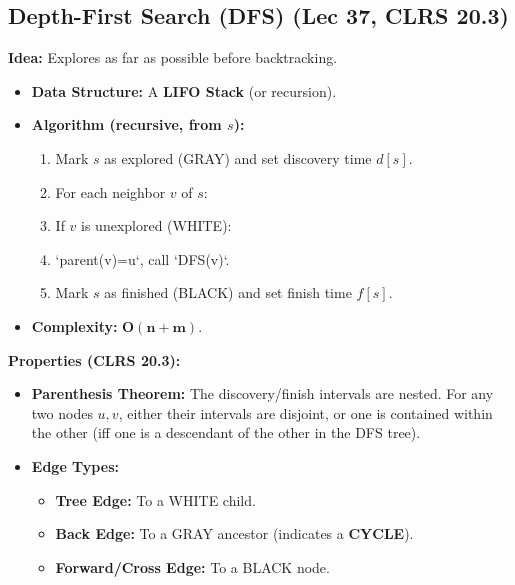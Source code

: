 \subsection{Depth-First Search (DFS) (Lec 37, CLRS 20.3)}
\textbf{Idea:} Explores as far as possible before backtracking.
\begin{itemize}
    \item \textbf{Data Structure:} A \textbf{LIFO Stack} (or recursion).
    \item \textbf{Algorithm (recursive, from $s$):}
    \begin{enumerate}
        \item Mark $s$ as explored (GRAY) and set discovery time $d[s]$.
        \item For each neighbor $v$ of $s$:
        \item If $v$ is unexplored (WHITE):
        \item `parent(v)=u`, call `DFS(v)`.
        \item Mark $s$ as finished (BLACK) and set finish time $f[s]$.
    \end{enumerate}
    \item \textbf{Complexity:} $\mathbf{O(n+m)}$.
\end{itemize}
\textbf{Properties (CLRS 20.3):}
\begin{itemize}
    \item \textbf{Parenthesis Theorem:} The discovery/finish intervals are nested. For any two nodes $u, v$, either their intervals are disjoint, or one is contained within the other (iff one is a descendant of the other in the DFS tree).
    \item \textbf{Edge Types:}
    \begin{itemize}
        \item \textbf{Tree Edge:} To a WHITE child.
        \item \textbf{Back Edge:} To a GRAY ancestor (indicates a \textbf{CYCLE}).
        \item \textbf{Forward/Cross Edge:} To a BLACK node.
    \end{itemize}
\end{itemize}

